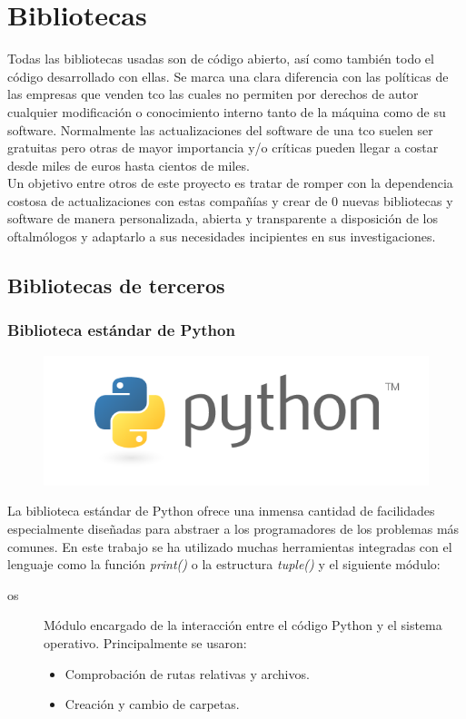 \chapter{Bibliotecas}
Todas las bibliotecas usadas son de código abierto, así como también
todo el código desarrollado con ellas. Se marca una clara diferencia
con las políticas de las empresas que venden \gls{tco} las cuales no
permiten por derechos de autor cualquier modificación o conocimiento
interno tanto de la máquina como de su software. Normalmente las
actualizaciones del software de una \gls{tco} suelen ser gratuitas
pero otras de mayor importancia y/o críticas pueden llegar a costar
desde miles de euros hasta cientos de miles. \\
Un objetivo entre otros de este proyecto es tratar de romper con la
dependencia costosa de actualizaciones con estas compañías y crear de
0 nuevas bibliotecas y software de manera personalizada, abierta y
transparente a disposición de los oftalmólogos y adaptarlo a sus
necesidades incipientes en sus investigaciones.

\section{Bibliotecas de terceros}
\subsection{Biblioteca estándar de Python}
\begin{figure}[H]
  \hspace*{2.3cm}
  \includegraphics[scale=0.2]{imagenes/logos/python_logo.png}
\end{figure}
La biblioteca estándar de Python ofrece una inmensa cantidad de
facilidades especialmente diseñadas para abstraer a los programadores
de los problemas más comunes. En este trabajo se ha utilizado muchas
herramientas integradas con el lenguaje como la función \emph{print()}
o la estructura \emph{tuple()} y el siguiente módulo:
\begin{description}
\item[os] Módulo encargado de la interacción entre el código Python y
  el sistema operativo. Principalmente se usaron:
  \begin{itemize}
  \item Comprobación de rutas relativas y archivos.
  \item Creación y cambio de carpetas.
  \end{itemize}
\end{description}

